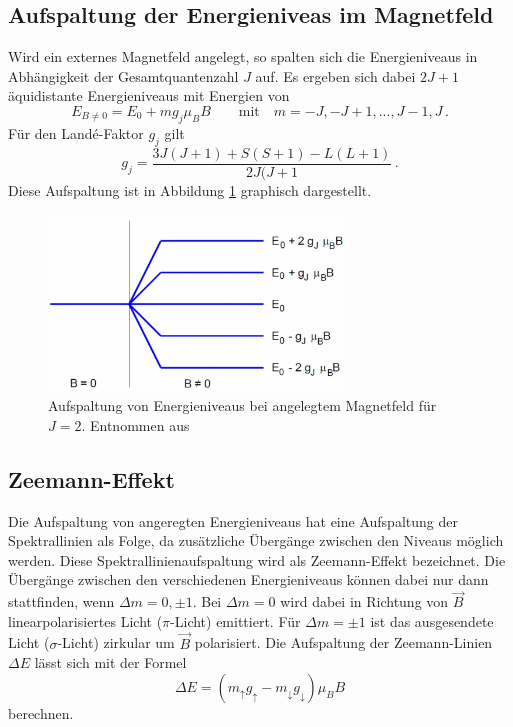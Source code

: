         \subsection{Aufspaltung der Energieniveas im Magnetfeld}
            Wird ein externes Magnetfeld angelegt, so spalten sich die Energieniveaus in Abhängigkeit der Gesamtquantenzahl $J$ auf.
            Es ergeben sich dabei $2J+1$ äquidistante Energieniveaus mit Energien von
            \begin{equation}
                E_{B\neq 0}=E_0+mg_j\mu_BB \qquad\text{mit}\quad m=-J,-J+1,...,J-1,J \, .
                \label{eqn:E}
            \end{equation}
            Für den Landé-Faktor $g_j$ gilt
            \begin{equation}
                g_j=\frac{3J(J+1)+S(S+1)-L(L+1)}{2J(J+1} \, .
            \end{equation}
            Diese Aufspaltung ist in Abbildung \ref{fig:Aufspaltung} graphisch dargestellt.
            \begin{figure}[h]
                \centering
                \includegraphics[width = 0.7\textwidth]{pictures/aufspaltung.png}
                \caption{Aufspaltung von Energieniveaus bei angelegtem Magnetfeld für $J=2$. Entnommen aus \cite{haken_atom-_2004}}
                \label{fig:Aufspaltung}
            \end{figure}
        \subsection{Zeemann-Effekt}
            Die Aufspaltung von angeregten Energieniveaus hat eine Aufspaltung der Spektrallinien als Folge,
            da zusätzliche Übergänge zwischen den Niveaus möglich werden.
            Diese Spektrallinienaufspaltung wird als Zeemann-Effekt bezeichnet.
            Die Übergänge zwischen den verschiedenen Energieniveaus können dabei nur dann stattfinden, wenn $\Delta m=0,\pm 1$.
            Bei $\Delta m=0$ wird dabei in Richtung von $\vec{B}$ linearpolarisiertes Licht ($\pi$-Licht) emittiert.
            Für $\Delta m=\pm 1$ ist das ausgesendete Licht ($\sigma$-Licht) zirkular um $\vec{B}$ polarisiert.
            Die Aufspaltung der Zeemann-Linien $\Delta E$ lässt sich mit der Formel
            \begin{equation}
                \Delta E= \left(m_\uparrow g_\uparrow-m_\downarrow g_\downarrow \right)\mu_BB
            \end{equation}
            berechnen.
    
